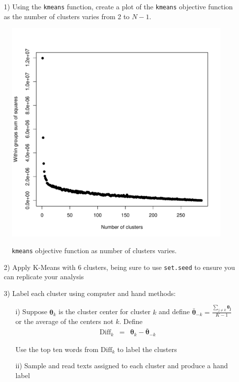 \documentclass[12pt,letterpaper]{article}
\begin{document}
\begin{itemize}
\item[1)] Using the {\tt kmeans} function, create a plot of the {\tt kmeans} objective function as the number of clusters varies from 2 to $N - 1$.  
\end{itemize}
  
  
  
\begin{figure}[H]
  \caption{\footnotesize{{\tt kmeans} objective function as number of clusters varies.}}
  \centering
   \includegraphics[width=.7\linewidth]{HW3kmeansClusters.pdf}\\
\end{figure}
  
  
 \begin{itemize}
\item[2)] Apply K-Means with 6 clusters, being sure to use {\tt set.seed} to ensure you can replicate your analysis
\item[3)] Label each cluster using computer and hand methods:
\begin{itemize}
\item[i)] Suppose $\boldsymbol{\theta}_{k}$ is the cluster center for cluster $k$ and define $\bar{\boldsymbol{\theta}}_{-k} = \frac{\sum_{j \neq k} \boldsymbol{\theta_{j}}   }{K-1 }$ or the average of the centers not $k$.  Define 
\begin{eqnarray}
\text{Diff}_{k} & = & \boldsymbol{\theta}_{k} - \bar{\boldsymbol{\theta}}_{-k}\nonumber 
\end{eqnarray}

  

Use the top ten words from $\text{Diff}_{k}$ to label the clusters
\item[ii)] Sample and read texts assigned to each cluster and produce a hand label
\end{itemize}
\end{itemize}
\end{document}
